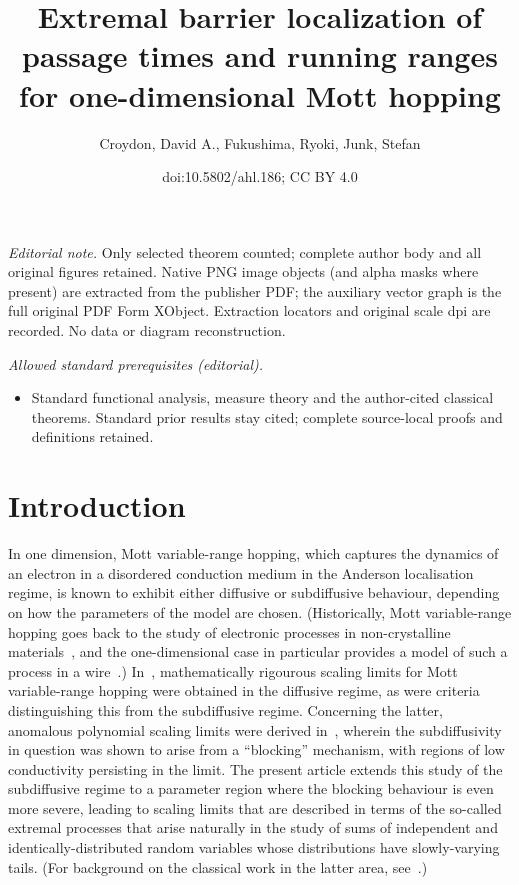 \documentclass[10pt]{amsart}
\title{Extremal barrier localization of passage times and running ranges for one-dimensional Mott hopping}
\author{Croydon, David A., Fukushima, Ryoki, Junk, Stefan}
\date{doi:10.5802/ahl.186; CC BY 4.0}
\theoremstyle{definition}\newtheorem{defi}[theo]{Definition}\newtheorem{rema}[theo]{Remark}\newtheorem{exam}[theo]{Example}\newtheorem{exem}[theo]{Example}\newtheorem{nota}[theo]{Notation}
\begin{document}
\maketitle
\noindent\textit{Editorial note.} Only selected theorem counted; complete author body and all original figures retained. Native PNG image objects (and alpha masks where present) are extracted from the publisher PDF; the auxiliary vector graph is the full original PDF Form XObject. Extraction locators and original scale dpi are recorded. No data or diagram reconstruction.\par\medskip
\noindent\textit{Allowed standard prerequisites (editorial).}\begin{itemize}
\item Standard functional analysis, measure theory and the author-cited classical theorems. Standard prior results stay cited; complete source-local proofs and definitions retained.
\end{itemize}\medskip

\section{Introduction}\label{sec:intro}

In one dimension, Mott variable-range hopping, which captures the dynamics of an electron in a disordered conduction medium in the Anderson localisation regime, is known to exhibit either diffusive or subdiffusive behaviour, depending on how the parameters of the model are chosen. (Historically, Mott variable-range hopping goes back to the study of electronic processes in non-crystalline materials~\cite{Mott1, Mott2}, and the one-dimensional case in particular provides a model of such a process in a wire~\cite{Alex, Lee, Serota, Star}.) In~\cite{CF}, mathematically rigourous scaling limits for Mott variable-range hopping were obtained in the diffusive regime, as were criteria distinguishing this from the subdiffusive regime. Concerning the latter, anomalous polynomial scaling limits were derived in~\cite{CFJ}, wherein the subdiffusivity in question was shown to arise from a ``blocking'' mechanism, with regions of low conductivity persisting in the limit. The present article extends this study of the subdiffusive regime to a parameter region where the blocking behaviour is even more severe, leading to scaling limits that are described in terms of the so-called extremal processes that arise naturally in the study of sums of independent and identically-distributed random variables whose distributions have slowly-varying tails. (For background on the classical work in the latter area, see~\cite{Gnedenko, Lamperti, Res87}.)
\end{document}
